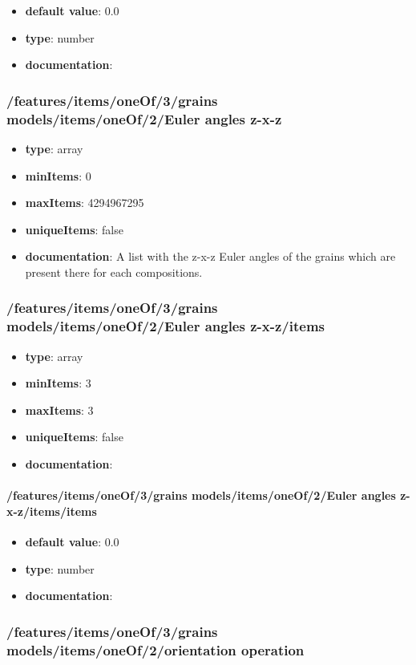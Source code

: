 \begin{itemize}\item {\bf default value}: 0.0
\item {\bf type}: number
\item {\bf documentation}: 
\end{itemize}\subsubsection{/features/items/oneOf/3/grains models/items/oneOf/2/Euler angles z-x-z}
\begin{itemize}\item {\bf type}: array
\item {\bf minItems}: 0
\item {\bf maxItems}: 4294967295
\item {\bf uniqueItems}: false
\item {\bf documentation}: A list with the z-x-z Euler angles of the grains which are present there for each compositions.
\end{itemize}\subsubsection{/features/items/oneOf/3/grains models/items/oneOf/2/Euler angles z-x-z/items}
\begin{itemize}\item {\bf type}: array
\item {\bf minItems}: 3
\item {\bf maxItems}: 3
\item {\bf uniqueItems}: false
\item {\bf documentation}: 
\end{itemize}\paragraph{/features/items/oneOf/3/grains models/items/oneOf/2/Euler angles z-x-z/items/items}
\begin{itemize}\item {\bf default value}: 0.0
\item {\bf type}: number
\item {\bf documentation}: 
\end{itemize}\subsubsection{/features/items/oneOf/3/grains models/items/oneOf/2/orientation operation}
